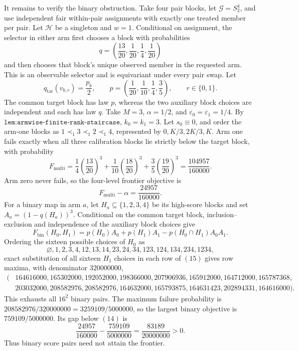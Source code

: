 It remains to verify the binary obstruction. Take four pair blocks, let \(\mathcal G=S_2^4\), and use independent fair within-pair assignments with exactly one treated member per pair. Let \(\mathcal H\) be a singleton and \(w=1\). Conditional on assignment, the selector in either arm first chooses a block with probabilities
\[
q=\left(\frac{13}{20},\frac1{20},\frac14,\frac1{20}\right)
\tag{11}
\]
and then chooses that block's unique observed member in the requested arm. This is an observable selector and is equivariant under every pair swap. Let
\[
q_{\mathrm{tar}}(v_{b,r})=\frac{p_b}{2},
\qquad
p=\left(\frac1{20},\frac1{10},\frac14,\frac35\right),
\qquad r\in\{0,1\}.
\tag{12}
\]
The common target block has law \(p\), whereas the two auxiliary block choices are independent and each has law \(q\). Take \(M=3\), \(\alpha=1/2\), and \(\varepsilon_0=\varepsilon_1=1/4\). By \(\texttt{lem:armwise-finite-rank-staircase}\), \(k_0=k_1=3\). Let \(s_0\equiv0\), and order the arm-one blocks as \(1\prec_1 3\prec_1 2\prec_1 4\), represented by \(0,K/3,2K/3,K\). Arm one fails exactly when all three calibration blocks lie strictly below the target block, with probability
\[
F_{\mathrm{multi}}
=\frac14\left(\frac{13}{20}\right)^3
+\frac1{10}\left(\frac{18}{20}\right)^3
+\frac35\left(\frac{19}{20}\right)^3
=\frac{104957}{160000}.
\tag{13}
\]
Arm zero never fails, so the four-level frontier objective is
\[
F_{\mathrm{multi}}-\alpha=\frac{24957}{160000}.
\tag{14}
\]
For a binary map in arm \(a\), let \(H_a\subseteq\{1,2,3,4\}\) be its high-score blocks and set \(A_a=(1-q(H_a))^3\). Conditional on the common target block, inclusion--exclusion and independence of the auxiliary block choices give
\[
F_{\mathrm{bin}}(H_0,H_1)
=p(H_0)A_0+p(H_1)A_1-p(H_0\cap H_1)A_0A_1.
\tag{15}
\]
Ordering the sixteen possible choices of \(H_0\) as
\[
\varnothing,1,2,3,4,12,13,14,23,24,34,123,124,134,234,1234,
\]
exact substitution of all sixteen \(H_1\) choices in each row of \((15)\) gives row maxima, with denominator \(320000000\),
\[
\begin{split}
(&164616000,165302000,192052000,198366000,207906936,165912000,164712000,165787368,\\
&203032000,208582976,208582976,164632000,165793875,164631423,202894331,164616000).
\end{split}
\tag{16}
\]
This exhausts all \(16^2\) binary pairs. The maximum failure probability is \(208582976/320000000=3259109/5000000\), so the largest binary objective is \(759109/5000000\). Its gap below \((14)\) is
\[
\frac{24957}{160000}-\frac{759109}{5000000}
=\frac{83189}{20000000}>0.
\tag{17}
\]
Thus binary score pairs need not attain the frontier.

